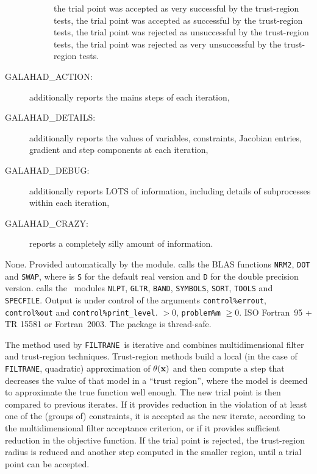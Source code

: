 \documentclass{galahad}
\newcommand{\packagename}{FILTRANE}
\newcommand{\sym}{\sf\small}
\newcommand{\filtrane}{{\tt \packagename}}
\begin{document}
\begin{description}
\begin{description}
 the trial point was accepted as very successful by the trust-region
tests,
 the trial point was accepted as successful by the trust-region
tests,
 the trial point was rejected as unsuccessful by the trust-region
tests,
 the trial point was rejected as very unsuccessful by the
trust-region tests.
\end{description}
\item[\sym GALAHAD\_ACTION:] additionally reports the mains steps of each
iteration,
\item[\sym GALAHAD\_DETAILS:] additionally reports the values of variables,
constraints,  Jacobian entries, gradient and step components at each
iteration,
\item[\sym GALAHAD\_DEBUG:] additionally reports LOTS of information,
including details of subprocesses within each iteration,
\item[\sym GALAHAD\_CRAZY:] reports a completely silly amount of information.
\end{description}


\galgeneral

\galcommon None.
\galworkspace Provided automatically by the module.
\galroutines {\tt \packagename\_solve} calls the BLAS functions {\tt *NRM2},
{\tt *DOT} and {\tt *SWAP}, where {\tt *} is {\tt S} for
the default real version and {\tt D} for the double precision version.
\galmodules {\tt \packagename} calls the \galahad\ modules
{\tt NLPT}, {\tt GLTR}, {\tt BAND}, {\tt SYMBOLS}, {\tt SORT}, {\tt TOOLS} and
{\tt SPECFILE}.
\galio Output is under control of the arguments
 {\tt control\%errout}, {\tt control\%out} and {\tt control\%print\_level}.
 $> 0$,
{\tt problem\%m} $\geq  0$.
\galportability ISO Fortran~95 + TR 15581 or Fortran~2003.
The package is thread-safe.


\galmethod

The method used by \filtrane\ is iterative and combines multidimensional
filter and trust-region techniques.  Trust-region methods
build a local (in the case of \filtrane , quadratic) approximation of
$\theta({\mathbf{x}})$ and then compute a step that decreases the value of that model
in a ``trust region'', where the model is deemed to approximate the true
function well enough. The new trial point is then compared to previous
iterates. If it provides reduction in the violation of at least one of the
(groups of) constraints, it is accepted as the new iterate, according to the
multidimensional filter acceptance criterion, or if it provides sufficient
reduction in the objective function. If the trial point is rejected,
the trust-region radius is reduced and another step computed in the smaller
region, until a trial point can be accepted.
\end{document}
